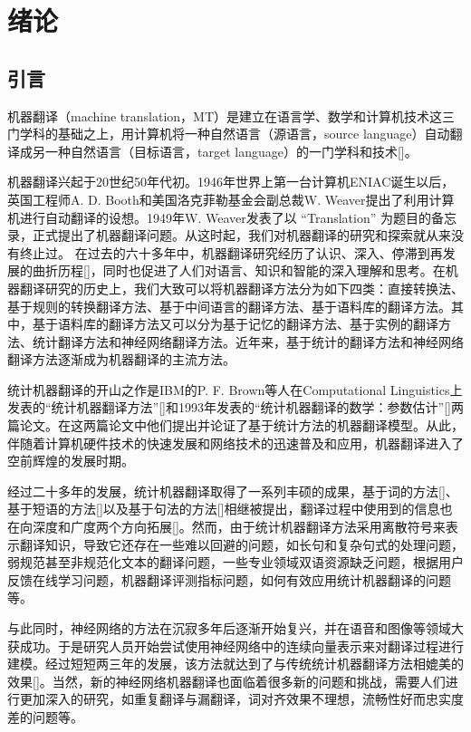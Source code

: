 
\chapter{绪论}
\label{Chapter_introduction} %

\section{引言}

机器翻译（machine translation，MT）是建立在语言学、数学和计算机技术这三门学科的基础之上，用计算机将一种自然语言（源语言，source language）自动翻译成另一种自然语言（目标语言，target language）的一门学科和技术[\cite{zhangzong:2013,zong:2013}]。

机器翻译兴起于20世纪50年代初。1946年世界上第一台计算机ENIAC诞生以后，英国工程师A. D. Booth和美国洛克菲勒基金会副总裁W. Weaver提出了利用计算机进行自动翻译的设想。1949年W. Weaver发表了以 ``Translation'' 为题目的备忘录，正式提出了机器翻译问题。从这时起，我们对机器翻译的研究和探索就从来没有终止过。
在过去的六十多年中，机器翻译研究经历了认识、深入、停滞到再发展的曲折历程[\cite{Hutchins:2007}]，同时也促进了人们对语言、知识和智能的深入理解和思考。在机器翻译研究的历史上，我们大致可以将机器翻译方法分为如下四类：直接转换法、基于规则的转换翻译方法、基于中间语言的翻译方法、基于语料库的翻译方法。其中，基于语料库的翻译方法又可以分为基于记忆的翻译方法、基于实例的翻译方法、统计翻译方法和神经网络翻译方法。近年来，基于统计的翻译方法和神经网络翻译方法逐渐成为机器翻译的主流方法。

统计机器翻译的开山之作是IBM的P. F. Brown等人在Computational Linguistics上发表的“统计机器翻译方法”[\cite{Brown:1990}]和1993年发表的“统计机器翻译的数学：参数估计”[\cite{Brown:1993}]两篇论文。在这两篇论文中他们提出并论证了基于统计方法的机器翻译模型。从此，伴随着计算机硬件技术的快速发展和网络技术的迅速普及和应用，机器翻译进入了空前辉煌的发展时期。

经过二十多年的发展，统计机器翻译取得了一系列丰硕的成果，基于词的方法[\cite{Brown:1990,Brown:1993}]、基于短语的方法[\cite{Marcu:2002,Koehn:2003}]以及基于句法的方法[\cite{Galley:2004,Chiang:2005,Galley:2006,LiuYang:2006}]相继被提出，翻译过程中使用到的信息也在向深度和广度两个方向拓展[\cite{Zhai:2012,TuMei:2013,TuMei:2014}]。然而，由于统计机器翻译方法采用离散符号来表示翻译知识，导致它还存在一些难以回避的问题，如长句和复杂句式的处理问题，弱规范甚至非规范化文本的翻译问题，一些专业领域双语资源缺乏问题，根据用户反馈在线学习问题，机器翻译评测指标问题，如何有效应用统计机器翻译的问题等。

与此同时，神经网络的方法在沉寂多年后逐渐开始复兴，并在语音和图像等领域大获成功。于是研究人员开始尝试使用神经网络中的连续向量表示来对翻译过程进行建模。经过短短两三年的发展，该方法就达到了与传统统计机器翻译方法相媲美的效果[\cite{Kalchbrenner:2013,Sutskever:2014,Cho:2014,Bahdanau:2015}]。当然，新的神经网络机器翻译也面临着很多新的问题和挑战，需要人们进行更加深入的研究，如重复翻译与漏翻译，词对齐效果不理想，流畅性好而忠实度差的问题等。

